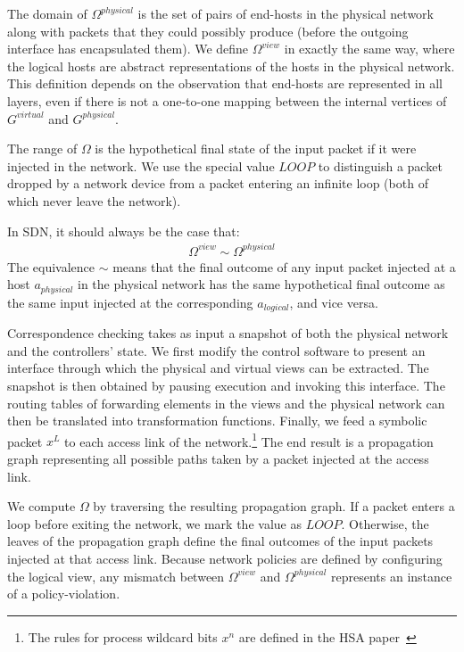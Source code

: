 The domain of $\Omega^{physical}$ is the set of pairs of end-hosts in the
physical network along with packets that they could possibly produce (before
the outgoing interface has encapsulated them). We define $\Omega^{view}$ in exactly the same way, where
the logical hosts are abstract representations of the hosts in the physical
network. This definition depends on the observation that end-hosts are represented
in all layers, even if there is not a one-to-one mapping between the
internal vertices of $G^{virtual}$ and $G^{physical}$.

The range of $\Omega$ is the hypothetical final state of the
input packet if it were injected in the network.
We use the special value $LOOP$ to distinguish
a packet dropped by a network device from a packet entering an
infinite loop (both of which never leave the network).

In SDN, it should always be the case that:
\begin{align*}
\Omega^{view} \sim \Omega^{physical}
\end{align*}
The equivalence $\sim$ means that the final outcome of any input packet
injected at a host $a_{physical}$ in the physical network has the same hypothetical final outcome as
the same input injected at the corresponding $a_{logical}$, and vice versa.

Correspondence checking takes as input a
snapshot of both the physical network and the
controllers' state. We first modify the control software to present an
interface through which the physical and virtual views can be
extracted. The snapshot is
then obtained by pausing execution and invoking this interface.
The routing tables of forwarding elements in the views and the physical
network can then be translated into transformation functions.
Finally, we feed a symbolic packet $x^L$ to each access link of the
network.\footnote{The rules for process wildcard bits $x^n$ are defined in
the HSA paper~\cite{hsa}} The end result is a propagation graph representing
all possible paths taken by a packet injected
at the access link.

We compute $\Omega$ by traversing the resulting propagation graph. If a packet
enters a loop before exiting the network, we mark the value as
$LOOP$. Otherwise,
the leaves of the propagation graph define the final outcomes of the input
packets injected at that access link. Because network policies are defined by
configuring the logical view, any mismatch between $\Omega^{view}$ and $\Omega^{physical}$
represents an instance of a policy-violation.

